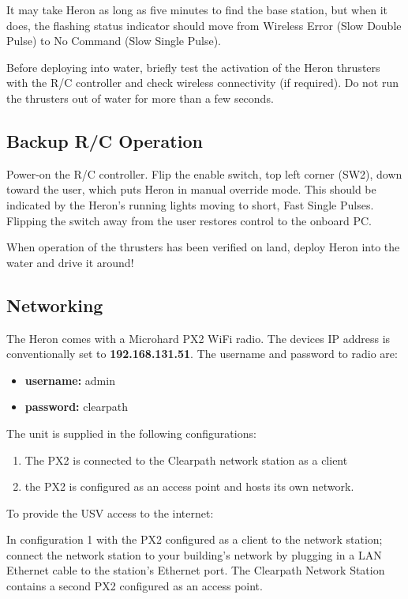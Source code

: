 \documentclass[]{clearpath-latex/clearpath-manual}
\begin{document}
It may take Heron as long as five minutes to find the base station, but when it does, the flashing status indicator should move from Wireless Error (Slow Double Pulse) to No Command (Slow Single Pulse).

Before deploying into water, briefly test the activation of the Heron thrusters with the R/C controller and check wireless connectivity (if required). Do not run the thrusters out of water for more than a few seconds.

\subsection{Backup R/C Operation} \label{backupoperation}
Power-on the R/C controller. Flip the enable switch, top left corner (SW2), down toward the user, which puts Heron in manual override mode. This should be indicated by the Heron's running lights moving to short, Fast Single Pulses. Flipping the switch away from the user restores control to the onboard PC.

When operation of the thrusters has been verified on land, deploy Heron into the water and drive it around!

\subsection{Networking}

The Heron comes with a Microhard PX2 WiFi radio. The devices IP address is conventionally set to \textbf{192.168.131.51}.
The username and password to radio are:
\begin{itemize}
\item \textbf{username:} admin
\item \textbf{password:} clearpath
\end{itemize}


 The unit is supplied in the following configurations:

\begin{enumerate}
\item The PX2 is connected to the Clearpath network station as a client
\item the PX2 is configured as an access point and hosts its own network.
\end{enumerate}

To provide the USV access to the internet:

In configuration 1 with the PX2 configured as a client to the network station; connect the network station to your building's network by plugging in a LAN Ethernet cable to the station's Ethernet port. The Clearpath Network Station contains a second PX2 configured as an access point.
\end{document}
